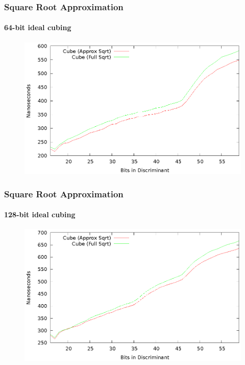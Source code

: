 \documentclass{beamer}
\begin{document}
\begin{frame}
\frametitle{Square Root Approximation}
\framesubtitle{64-bit ideal cubing}
\begin{figure}
\includegraphics[scale=0.86]{cube-sqrtopt-64}
\end{figure}
\end{frame}

\begin{frame}
\frametitle{Square Root Approximation}
\framesubtitle{128-bit ideal cubing}
\begin{figure}
\includegraphics[scale=0.86]{cube-sqrtopt-128}
\end{figure}
\end{frame}
\end{document}
